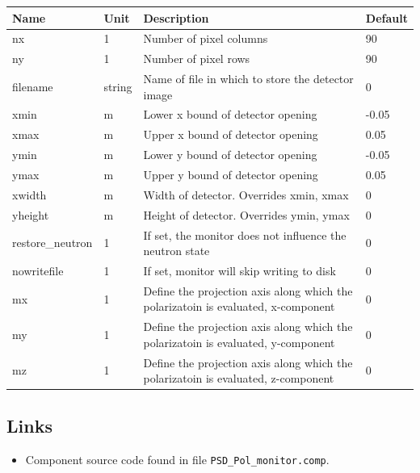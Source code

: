 \begin{longtable}{p{}p{}p{}p{}}
\toprule
\textbf{Name} & \textbf{Unit} & \textbf{Description} & \textbf{Default} \\
\midrule
\endhead
nx & 1 & Number of pixel columns & 90 \\
ny & 1 & Number of pixel rows & 90 \\
filename & string & Name of file in which to store the detector image & 0 \\
xmin & m & Lower x bound of detector opening & -0.05 \\
xmax & m & Upper x bound of detector opening & 0.05 \\
ymin & m & Lower y bound of detector opening & -0.05 \\
ymax & m & Upper y bound of detector opening & 0.05 \\
xwidth & m & Width of detector. Overrides xmin, xmax & 0 \\
yheight & m & Height of detector. Overrides ymin, ymax & 0 \\
restore\_neutron & 1 & If set, the monitor does not influence the neutron state & 0 \\
nowritefile & 1 & If set, monitor will skip writing to disk & 0 \\
mx & 1 & Define the projection axis along which the polarizatoin is evaluated, x-component & 0 \\
my & 1 & Define the projection axis along which the polarizatoin is evaluated, y-component & 0 \\
mz & 1 & Define the projection axis along which the polarizatoin is evaluated, z-component & 0 \\
\bottomrule
\end{longtable}

\subsection*{Links}
\begin{itemize}
  \item Component source code found in file \texttt{PSD\_Pol\_monitor.comp}.
\end{itemize}

